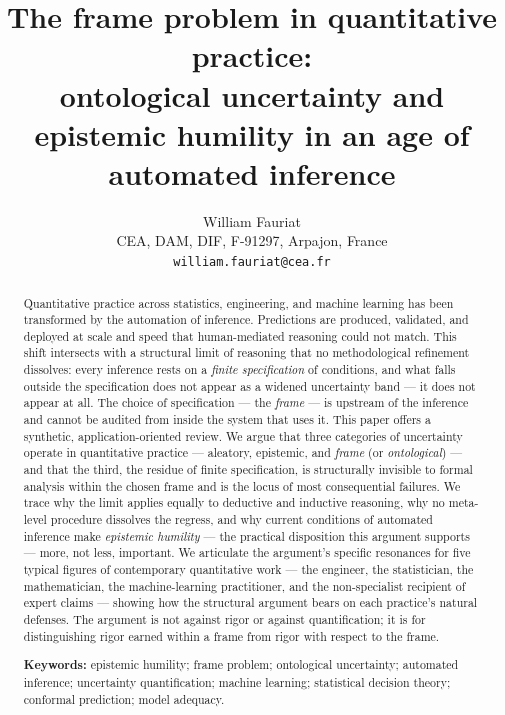 \documentclass[11pt,a4paper]{article}
\title{The frame problem in quantitative practice:\\[0.3em]
ontological uncertainty and epistemic humility in an age of automated inference}
\author{William Fauriat\\[0.4em]
\small CEA, DAM, DIF, F-91297, Arpajon, France\\[0.2em]
\small \texttt{william.fauriat@cea.fr}}
\date{}
\begin{document}
\maketitle
\begin{abstract}
\noindent Quantitative practice across statistics, engineering, and machine
learning has been transformed by the automation of inference. Predictions are
produced, validated, and deployed at scale and speed that human-mediated
reasoning could not match. This shift intersects with a structural limit of
reasoning that no methodological refinement dissolves: every inference rests
on a \emph{finite specification} of conditions, and what falls outside the
specification does not appear as a widened uncertainty band --- it does not
appear at all. The choice of specification --- the \emph{frame} --- is
upstream of the inference and cannot be audited from inside the system that
uses it. This paper offers a synthetic, application-oriented review. We
argue that three categories of uncertainty operate in quantitative practice
--- aleatory, epistemic, and \emph{frame} (or \emph{ontological}) --- and that the third, the
residue of finite specification, is structurally invisible to formal
analysis within the chosen frame and is the locus of most consequential
failures. We trace why the limit applies equally to deductive and inductive
reasoning, why no meta-level procedure dissolves the regress, and why
current conditions of automated inference make \emph{epistemic humility}
--- the practical disposition this argument supports --- more, not less,
important. We articulate the argument's specific resonances for five
typical figures of contemporary quantitative work --- the engineer, the
statistician, the mathematician, the machine-learning practitioner, and
the non-specialist recipient of expert claims --- showing how the
structural argument bears on each practice's natural defenses. The argument
is not against rigor or against quantification; it is for distinguishing
rigor earned within a frame from rigor with respect to the frame.

\vspace{0.6em}
\noindent\textbf{Keywords:} epistemic humility; frame problem; ontological
uncertainty; automated inference; uncertainty quantification; machine
learning; statistical decision theory; conformal prediction; model adequacy.
\end{abstract}
\end{document}
